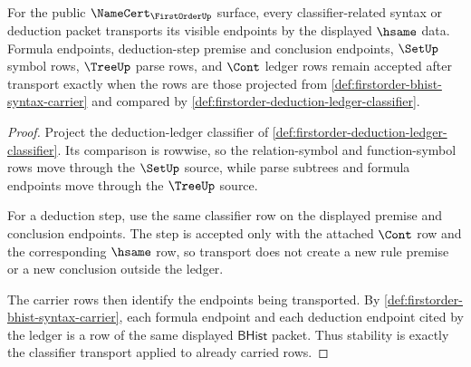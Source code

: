 \begin{theorem}\label{thm:firstorder-hsame-stability-obligation}
For the public $\NameCert_{\FirstOrderUp}$ surface, every classifier-related
syntax or deduction packet transports its visible endpoints by the displayed
$\hsame$ data. Formula endpoints, deduction-step premise and conclusion
endpoints, $\SetUp$ symbol rows, $\TreeUp$ parse rows, and $\Cont$ ledger rows
remain accepted after transport exactly when the rows are those projected from
\autoref{def:firstorder-bhist-syntax-carrier} and compared by
\autoref{def:firstorder-deduction-ledger-classifier}.
\end{theorem}
\begin{proof}
Project the deduction-ledger classifier of
\autoref{def:firstorder-deduction-ledger-classifier}. Its comparison is
rowwise, so the relation-symbol and function-symbol rows move through the
$\SetUp$ source, while parse subtrees and formula endpoints move through the
$\TreeUp$ source.

For a deduction step, use the same classifier row on the displayed premise
and conclusion endpoints. The step is accepted only with the attached $\Cont$
row and the corresponding $\hsame$ row, so transport does not create a new
rule premise or a new conclusion outside the ledger.

The carrier rows then identify the endpoints being transported. By
\autoref{def:firstorder-bhist-syntax-carrier}, each formula endpoint and each
deduction endpoint cited by the ledger is a row of the same displayed
$\mathsf{BHist}$ packet. Thus stability is exactly the classifier transport
applied to already carried rows.
\end{proof}

